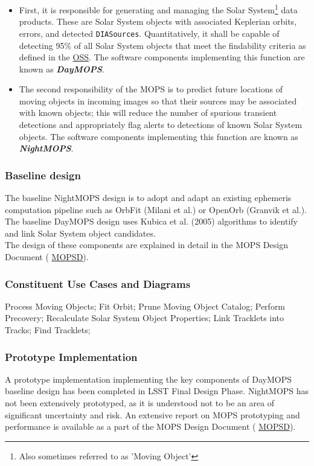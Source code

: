 \documentclass[12pt]{article}
\newcommand{\code}[1]{\texttt{#1}}
\newcommand{\DIASources}{\code{DIASources}\xspace}
\newcommand{\ds}[2]{{\color{blue} \href{https://docushare.lsstcorp.org/docushare/dsweb/Get/#1}{#2}}\xspace}
\newcommand{\OSS}{\ds{LSE-30}{OSS}}
\newcommand{\MOPSD}{\ds{LDM-156}{MOPSD}}
\begin{document}
\begin{itemize}
    \item First, it is responsible for generating and managing the Solar System\footnote{Also sometimes referred to as 'Moving Object'} data products. These are Solar System objects with associated Keplerian orbits, errors, and detected \DIASources. Quantitatively, it shall be capable of detecting 95\% of all Solar System objects that meet the findability criteria as defined in the \OSS. The software components implementing this function are known as {\bf \em DayMOPS}.
    \item The second responsibility of the MOPS is to predict future locations of moving objects in incoming images so that their sources may be associated with known objects; this will reduce the number of spurious transient detections and appropriately flag alerts to detections of known Solar System objects.  The software components implementing this function are known as {\bf \em NightMOPS}.
\end{itemize}

\subsubsection{Baseline design}

The baseline NightMOPS design is to adopt and adapt an existing ephemeris computation pipeline such as OrbFit (Milani et al.) or OpenOrb (Granvik et al.). The baseline DayMOPS design uses Kubica et al. (2005) algorithms to identify and link Solar System object candidates.
\\

The design of these components are explained in detail in the MOPS Design Document (\MOPSD).

\subsubsection{Constituent Use Cases and Diagrams}

Process Moving Objects;
Fit Orbit;
Prune Moving Object Catalog;
Perform Precovery;
Recalculate Solar System Object Properties;
Link Tracklets into Tracks;
Find Tracklets;

\subsubsection{Prototype Implementation}

A prototype implementation implementing the key components of DayMOPS baseline design has been completed in LSST Final Design Phase. NightMOPS has not been extensively prototyped, as it is understood not to be an area of significant uncertainty and risk. An extensive report on MOPS prototyping and performance is available as a part of the MOPS Design Document (\MOPSD).
\\
\end{document}
